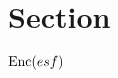 \documentclass[11pt]{article}
\title{\assignmenttitle}
\author{\myname\,(\myandrew)}
\date{\today} %
\begin{document}
\maketitle

\section{Section}

$\operatorname{Enc}(esf)$

% 
% 

\label{mylastpagelabel}
\end{document}
